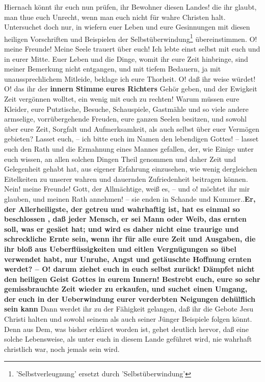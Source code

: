 Hiernach könnt ihr euch nun prüfen, ihr Bewohner diesen Landes! die ihr glaubt,
man thue euch Unrecht, wenn man euch nicht für wahre Christen halt. Untersuchet
doch nur, in wiefern euer Leben und eure Gesinnungen mit diesen heiligen
Vorschriften und Beispielen der Selbstüberwindung\footnote{'Selbstverleugnung' ersetzt durch 'Selbstüberwindung'} übereinstimmen. O! meine
Freunde! Meine Seele trauert über euch! Ich lebte einst selbst mit euch und in
eurer Mitte. Euer Leben und die Dinge, womit ihr eure Zeit hinbringe, sind
meiner Bemerkung nicht entgangen, und mit tiefem Bedauern, ja mit
unaussprechlichem Mitleide, beklage ich eure Thorheit. O! daß ihr weise würdet!
O! das ihr der \textbf{innern Stimme eures Richters} Gehör geben, und der Ewigkeit Zeit
vergönnen wolltet, ein wenig mit euch zu rechten! Warum müssen eure Kleider,
eure Putztische, Besuche, Schauspiele, Gastmähle und so viele andere armselige,
vorrübergehende Freuden, eure ganzen Seelen besitzen, und sowohl über eure Zeit,
Sorgfalt und Aufmerksamkeit, als auch selbst über euer Vermögen gebieten? Lasset
euch, -- ich bitte euch im Namen den lebendigen Gottes! -- lasset euch den Rath
und die Ermahnung eines Mannes gefallen, der, wie Einige unter euch wissen, an
allen solchen Dingen Theil genommen und daher Zeit und Gelegenheit gehabt hat,
aus eigener Erfahrung einzusehen, wie wenig dergleichen Eitelkeiten zu unserer
wahren und dauernden Zufriedenheit beitragen können. Nein! meine Freunde! Gott,
der Allmächtige, weiß es, -- und o! möchtet ihr mir glauben, und meinen Rath
annehmen! -- sie enden in Schande und Kummer..\textbf{Er, der Allerheiligste, der getreu
und wahrhaftig ist, hat es einmal so beschlossen , daß jeder Mensch, er sei Mann
oder Weib, das ernten soll, was er gesäet hat; und wird es daher nicht eine
traurige und schreckliche Ernte sein, wenn ihr für alle eure Zeit und Ausgaben,
die ihr bloß aus Ueberflüssigkeiten und eitlen Vergnügungen so übel verwendet
habt, nur Unruhe, Angst und getäuschte Hoffnung ernten werdet? -- O! darum
ziehet euch in euch selbst zurück! Dämpfet nicht den heiligen Geist Gottes in
eurem Innern! Bestrebt  euch, eure so sehr gemissbrauchte Zeit wieder zu
erkaufen, und suchet einen Umgang, der euch in der Ueberwindung eurer verderbten
Neigungen dehülflich sein kann} Dann werdet ihr zu der Fähigkeit gelangen, daß
ihr die Gebote Jesu Christi halten und sowohl seinem als auch seiner Jünger
Beispiele folgen könnt. Denn aus Dem, was bisher erkläret worden ist, gehet
deutlich hervor, daß eine solche Lebensweise, als unter euch in diesem Lande
geführet wird, nie wahrhaft christlich war, noch jemals sein wird.

